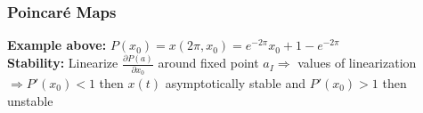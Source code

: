 \documentclass[fontsize=6pt]{scrartcl}
\renewcommand{\exp}[1]{e^{#1}}
\begin{document}
\begin{multicols*}{4}
\subsubsection*{Poincaré Maps}
\textbf{Example above:} $P(x_0) = x(2\pi, x_0) = \exp{-2\pi}x_0 + 1 -
\exp{-2\pi}$\\
\textbf{Stability:} Linearize $\frac{\partial P(a)}{\partial x_0}$ around fixed
point $a_I \Rightarrow$ values of linearization $\Rightarrow P'(x_0) < 1$ then
$x(t)$ asymptotically stable and $P'(x_0) > 1$ then unstable\\

\end{multicols*}
\end{document}

